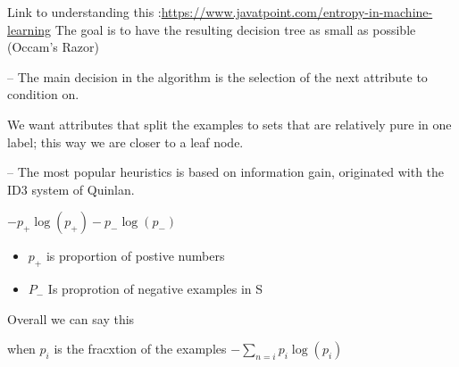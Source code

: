 \documentclass{article}
\theoremstyle{mytheoremstyle}
\theoremstyle{mytheoremstyle}
\theoremstyle{myproblemstyle}
\begin{document}
Link to understanding this :\url{https://www.javatpoint.com/entropy-in-machine-learning}
The goal is to have the resulting decision tree as small as
possible (Occam’s Razor)
\item – The main decision in the algorithm is the selection of the next
attribute to condition on.
\item  We want attributes that split the examples to sets that are
relatively pure in one label; this way we are closer to a leaf
node.
\item – The most popular heuristics is based on information gain, originated
with the ID3 system of Quinlan.

\begin{math}
	-p_+ \log (p_+) - p_- \log (p_-)
\end{math}
\begin{itemize}
	\item \( p_+ \) is proportion of postive numbers
	\item \( P_- \) Is proprotion of negative examples in S
\end{itemize}
Overall we can say this

when \( p_i \) is the fracxtion of the examples
\begin{math}
	-\sum_{n=i} p_i \log (p_i)
\end{math}
\end{document}
